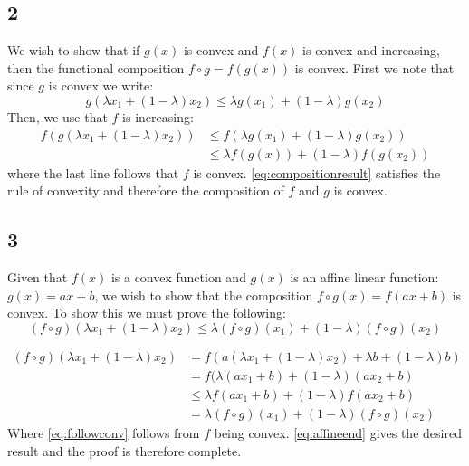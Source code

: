 \documentclass{article}
\begin{document}
\subsection{2}
We wish to show that if $g(x)$ is convex and $f(x)$ is convex and increasing, then the functional composition $f  \circ g = f(g(x))$ is convex. First we note that since $g$ is convex we write:
\begin{equation}
g(\lambda x_1 + (1 - \lambda) x_2 ) \leq \lambda g(x_1) + (1- \lambda)g(x_2) 
\end{equation}
Then, we use that $f$ is increasing:
\begin{align}
f(g(\lambda x_1 + (1 - \lambda) x_2 )) &\leq f(\lambda g(x_1) + (1- \lambda)g(x_2))\\
\label{eq:compositionresult}
&\leq \lambda f(g(x)) + (1- \lambda) f(g(x_2))
\end{align}
where the last line follows that $f$ is convex. \eqref{eq:compositionresult} satisfies the rule of convexity and therefore the composition of $f$ and $g$ is convex.
\subsection{3}
Given that $f(x)$ is a convex function and $g(x)$ is an affine linear function: $g(x) = ax +b$, we wish to show that the composition $f \circ g(x) = f(ax+b)$ is convex. To show this we must prove the following:
\begin{equation}
(f \circ g) (\lambda x_1 + (1 - \lambda) x_2) \leq \lambda(f \circ g)(x_1) + (1-\lambda)(f \circ g)(x_2)
\end{equation}

\begin{align}
(f \circ g) (\lambda x_1 + (1 - \lambda) x_2) &=
f(a(\lambda x_1 + (1 - \lambda)x_2) + \lambda b + (1-\lambda)b)\\
&= f(\lambda ( ax_1 + b) + (1-\lambda)(ax_2+b) \\
\label{eq:followconv}
&\leq \lambda f(ax_1+b) + (1-\lambda) f(ax_2 +b) \\
&= \lambda (f \circ g)(x_1) + (1-\lambda) (f \circ g) (x_2)
\label{eq:affineend}
\end{align}
Where \eqref{eq:followconv} follows from $f$ being convex. \eqref{eq:affineend} gives the desired result and the proof is therefore complete.
\end{document}
